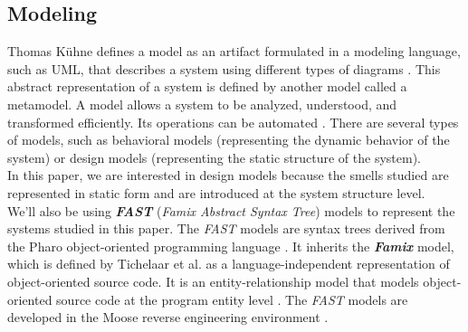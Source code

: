 


\subsection{Modeling}

Thomas Kühne defines a model as an artifact formulated in a modeling language, such as UML, that describes a system using different types of diagrams \cite{kuhne2006matters}. This abstract representation of a system is defined by another model called a metamodel. A model allows a system to be analyzed, understood, and transformed efficiently. Its operations can be automated \cite{gonzalez2014formal}. There are several types of models, such as behavioral models (representing the dynamic behavior of the system) or design models (representing the static structure of the system).\\In this paper, we are interested in design models because the smells studied are represented in static form and are introduced at the system structure level.\\

We'll also be using \textbf{\emph{FAST}} (\emph{Famix Abstract Syntax Tree})
models to represent the systems studied in this paper. The \emph{FAST} models
are syntax trees derived from the Pharo object-oriented programming language
\cite{black2010pharo, bergel2013deep, zaitsev2020characterizing}. It inherits
the \textbf{\emph{Famix}} model, which is defined by Tichelaar et al. as a
language-independent representation of object-oriented source code. It is an
entity-relationship model that models object-oriented source code at the program
entity level \cite{891485} \cite{demeyer1999famix}. The \emph{FAST} models are
developed in the Moose reverse engineering environment
\cite{ducasse2000moose}.\\\\




